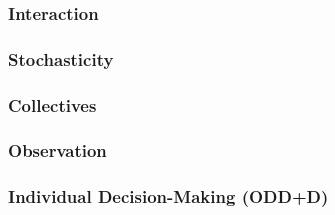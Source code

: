 \begin{guidingbox}
\end{guidingbox}

\subsubsection{Interaction}

\begin{guidingbox}
\end{guidingbox}

\subsubsection{Stochasticity}

\begin{guidingbox}
\end{guidingbox}

\subsubsection{Collectives}

\begin{guidingbox}
\end{guidingbox}

\subsubsection{Observation}

\begin{guidingbox}
\end{guidingbox}

\subsubsection{Individual Decision-Making (ODD+D)}

